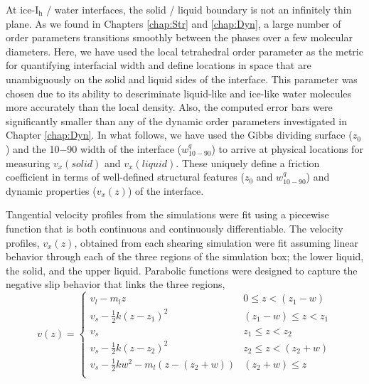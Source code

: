 At ice-I$_\mathrm{h}$ / water interfaces, the solid / liquid boundary
is not an infinitely thin plane. As we found in Chapters
\ref{chap:Str} and \ref{chap:Dyn}, a large number of order parameters
transitions smoothly between the phases over a few molecular
diameters.  Here, we have used the local tetrahedral order parameter
as the metric for quantifying interfacial width and define locations
in space that are unambiguously on the solid and liquid sides of the
interface. This parameter was chosen due to its ability to
descriminate liquid-like and ice-like water molecules more accurately
than the local density. Also, the computed error bars were
significantly smaller than any of the dynamic order parameters
investigated in Chapter \ref{chap:Dyn}. In what follows, we have used
the Gibbs dividing surface ($z_0$) and the 10$-$90 width of the
interface ($w_\mathrm{10-90}^{q}$) to arrive at physical locations for
measuring $v_{x}(solid)$ and $v_{x}(liquid)$.  These uniquely define a
friction coefficient in terms of well-defined structural features
($z_0$ and $w_\mathrm{10-90}^{q}$) and dynamic properties ($v_{x}(z)$)
of the interface.

Tangential velocity profiles from the simulations were fit using a
piecewise function that is both continuous and continuously
differentiable. The velocity profiles, $v_x(z)$, obtained from each
shearing simulation were fit assuming linear behavior through each of
the three regions of the simulation box; the lower liquid, the solid,
and the upper liquid. Parabolic functions were designed to capture the
negative slip behavior that links the three regions,
\begin{equation}\label{eq:vfit}
v(z) =
\begin{cases}
  v_{l} - m_{l}z & 0 \leq z < (z_{1} - w) \\
  v_{s} - \frac{1}{2}k(z-z_{1})^{2} & (z_{1}-w) \leq z < z_{1} \\
  v_{s}  & z_{1} \leq z < z_{2} \\
  v_{s} - \frac{1}{2}k(z-z_{2})^{2}  & z_{2} \leq z <( z_{2} + w)\\
  v_{s} - \frac{1}{2}kw^{2} - m_{l}(z-(z_{2} + w)) & (z_{2} + w) \leq z \\
\end{cases}
\end{equation}
  
